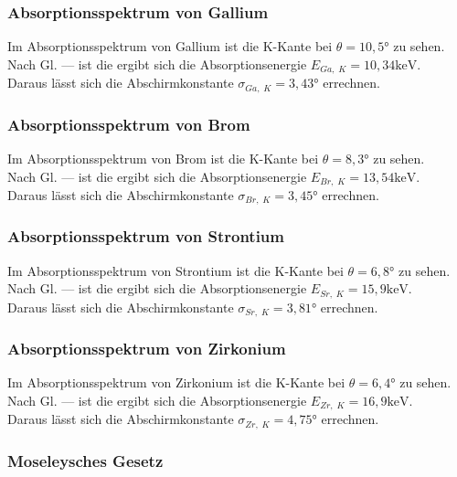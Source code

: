 \subsubsection*{Absorptionsspektrum von Gallium}
Im Absorptionsspektrum von Gallium ist die K-Kante bei $\theta = 10,5°$ zu sehen. \\
Nach Gl. --- ist die ergibt sich die Absorptionsenergie $E_{Ga, \; K} = 10,34 \mathrm{ keV}$.\\
Daraus lässt sich die Abschirmkonstante $\sigma_{Ga, \; K} = 3,43°$ errechnen.

\subsubsection*{Absorptionsspektrum von Brom}
Im Absorptionsspektrum von Brom ist die K-Kante bei $\theta = 8,3°$ zu sehen. \\
Nach Gl. --- ist die ergibt sich die Absorptionsenergie $E_{Br, \; K} = 13,54 \mathrm{ keV}$.\\
Daraus lässt sich die Abschirmkonstante $\sigma_{Br, \; K} = 3,45°$ errechnen.

\subsubsection*{Absorptionsspektrum von Strontium}
Im Absorptionsspektrum von Strontium ist die K-Kante bei $\theta = 6,8°$ zu sehen. \\
Nach Gl. --- ist die ergibt sich die Absorptionsenergie $E_{Sr,\; K} = 15,9  \mathrm{ keV}$.\\
Daraus lässt sich die Abschirmkonstante $\sigma_{Sr, \; K} = 3,81°$ errechnen.

\subsubsection*{Absorptionsspektrum von Zirkonium}
Im Absorptionsspektrum von Zirkonium ist die K-Kante bei $\theta = 6,4°$ zu sehen. \\
Nach Gl. --- ist die ergibt sich die Absorptionsenergie $E_{Zr, \; K} = 16,9  \mathrm{ keV}$.\\
Daraus lässt sich die Abschirmkonstante $\sigma_{Zr, \; K} = 4,75°$ errechnen.





\subsubsection*{Moseleysches Gesetz}

